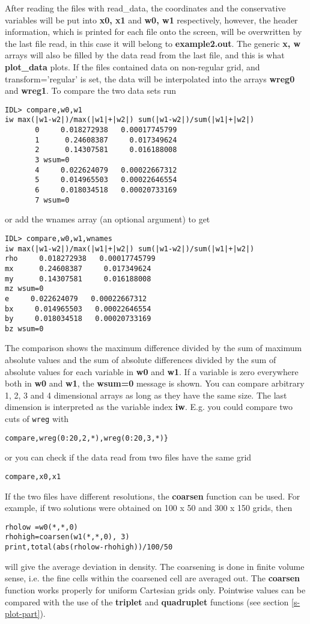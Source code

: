\documentclass{article}
\begin{document}
   After reading the files with read\_data, 
   the coordinates and the conservative variables 
   will be put into {\bf x0, x1} and {\bf w0, w1} respectively, however, 
   the header information, which is printed for each file onto the screen, 
   will be overwritten by the last file read, in this case it will belong to
   {\bf example2.out}. The generic {\bf x, w} arrays will also be
   filled by the data read from the last file, and this is what 
   {\bf plot\_data} plots. If the files contained data on non-regular grid,
   and transform='regular' is set, the data will be interpolated into 
   the arrays {\bf wreg0} and {\bf wreg1}. 
   To compare the two data sets run
\begin{verbatim}
IDL> compare,w0,w1
iw max(|w1-w2|)/max(|w1|+|w2|) sum(|w1-w2|)/sum(|w1|+|w2|)
       0     0.018272938   0.00017745799
       1      0.24608387     0.017349624
       2      0.14307581     0.016188008
       3 wsum=0
       4     0.022624079   0.00022667312
       5     0.014965503   0.00022646554
       6     0.018034518   0.00020733169
       7 wsum=0
\end{verbatim}
or add the wnames array (an optional argument) to get
\begin{verbatim}
IDL> compare,w0,w1,wnames
iw max(|w1-w2|)/max(|w1|+|w2|) sum(|w1-w2|)/sum(|w1|+|w2|)
rho     0.018272938   0.00017745799
mx      0.24608387     0.017349624
my      0.14307581     0.016188008
mz wsum=0
e     0.022624079   0.00022667312
bx     0.014965503   0.00022646554
by     0.018034518   0.00020733169
bz wsum=0
\end{verbatim}
   The comparison shows the maximum difference divided by the sum of maximum 
   absolute
   values and the sum of absolute differences divided by the sum of absolute
   values for each variable in {\bf w0} and {\bf w1}. If a variable is zero
   everywhere both in {\bf w0} and {\bf w1}, the {\bf wsum=0} message is shown.
   You can compare arbitrary 1, 2, 3 and 4 dimensional arrays as long as they 
   have the same size.
   The last dimension is interpreted as the variable index {\bf iw}.
   E.g. you could compare two cuts of {\tt wreg} with
\begin{verbatim}
compare,wreg(0:20,2,*),wreg(0:20,3,*)}
\end{verbatim}
   or you can check if the data read from two files have the same grid
\begin{verbatim}
compare,x0,x1
\end{verbatim}
   If the two files have different resolutions, the {\bf coarsen} 
   function can be used. For example, if two solutions were obtained on 
   100 x 50 and 300 x 150 grids, then 
\begin{verbatim}
rholow =w0(*,*,0)
rhohigh=coarsen(w1(*,*,0), 3)
print,total(abs(rholow-rhohigh))/100/50
\end{verbatim}
will give the average deviation in density. The coarsening is done in
finite volume sense, i.e. the fine cells within the coarsened cell are
averaged out. The {\bf coarsen} function works properly for
uniform Cartesian grids only. Pointwise values can be compared
with the use of the {\bf triplet} and {\bf quadruplet} functions 
(see section \ref{s-plot-part}).
\end{document}
